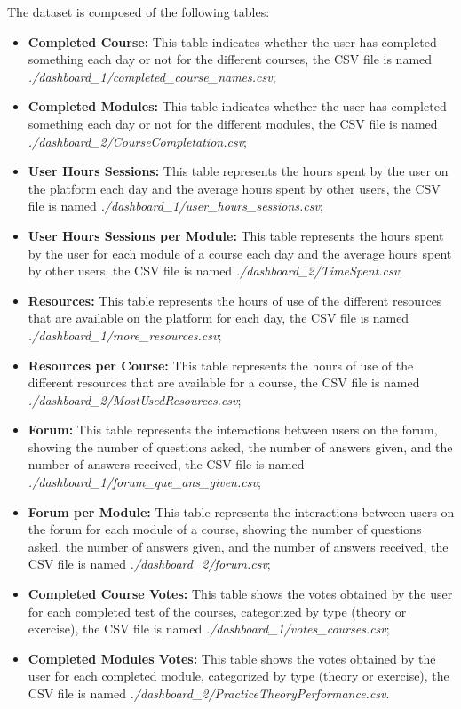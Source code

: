 The dataset is composed of the following tables:
\begin{itemize}
    \item 
        \textbf{Completed Course:} This table indicates whether the user has completed something each 
        day or not for the different courses, the CSV file is named \textit{./dashboard\_1/completed\_course\_names.csv};
    \item 
        \textbf{Completed Modules:} This table indicates whether the user has completed something each 
        day or not for the different modules, the CSV file is named \textit{./dashboard\_2/CourseCompletation.csv};
    \item 
        \textbf{User Hours Sessions:} This table represents the hours spent by the user on the platform 
        each day and the average hours spent by other users, the CSV file 
        is named \textit{./dashboard\_1/user\_hours\_sessions.csv};
    \item 
        \textbf{User Hours Sessions per Module:} This table represents the hours spent by the user for each module
        of a course each day and the average hours spent by other users, the CSV file 
        is named \textit{./dashboard\_2/TimeSpent.csv};
    \item 
        \textbf{Resources:} This table represents the hours of use of the different resources that are
        available on the platform for each day, the CSV file is named \textit{./dashboard\_1/more\_resources.csv};
    \item 
        \textbf{Resources per Course:} This table represents the hours of use of the different resources that are
        available for a course, the CSV file is named \textit{./dashboard\_2/MostUsedResources.csv};
    \item 
        \textbf{Forum:} This table represents the interactions between users on the forum, showing the number
        of questions asked, the number of answers given, and the number of answers received, the CSV file is named 
        \textit{./dashboard\_1/forum\_que\_ans\_given.csv};
    \item 
        \textbf{Forum per Module:} This table represents the interactions between users on the forum for each module of a course, showing the number
        of questions asked, the number of answers given, and the number of answers received, the CSV file is named 
        \textit{./dashboard\_2/forum.csv};
    \item 
        \textbf{Completed Course Votes:} This table shows the votes obtained by the user for each completed test of the courses, 
        categorized by type (theory or exercise), the CSV file is named \textit{./dashboard\_1/votes\_courses.csv};
    \item 
        \textbf{Completed Modules Votes:} This table shows the votes obtained by the user for each completed module, 
        categorized by type (theory or exercise), the CSV file is named \textit{./dashboard\_2/PracticeTheoryPerformance.csv}.
\end{itemize}
